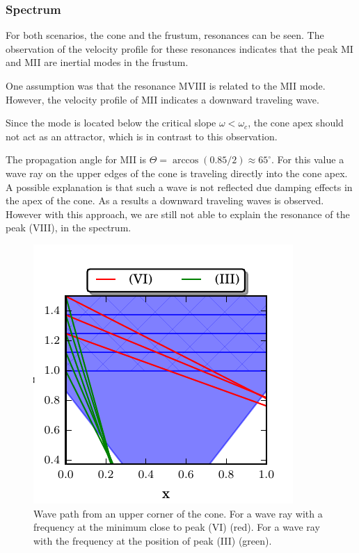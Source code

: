 \subsubsection{Spectrum}

For both scenarios, the cone and the frustum, resonances can be seen.
The observation of the velocity profile for these resonances indicates that
the peak M\RN{1} and M\RN{2} are inertial modes in the frustum.

One assumption was that the resonance M\RN{8} is related to the M\RN{2} mode.
However, the velocity profile of M\RN{2} indicates a downward traveling wave.

Since the mode is located below the critical slope $\omega < \omega_c$, the cone apex
should not act as an attractor, which is in contrast to this observation.

The propagation angle for M\RN{2} is $\Theta=\arccos(0.85/2)\approx65^\circ$.
For this value a wave ray on the upper edges of the cone is traveling directly
into the cone apex.
A possible explanation is that such a wave is not reflected due damping effects in
the apex of the cone. As a results a downward traveling waves is observed.
However with this approach, we are still not able to explain the resonance of the peak (\RN{8}),
in the spectrum.

\begin{figure}[!b]
  \begin{minipage}[c]{0.4\textwidth}
      \centering
      \includegraphics{gfx/cone/discussion/corners.pdf}
  \end{minipage}
  \hfill
  \begin{minipage}[c]{0.5\textwidth}
      \caption{\label{fig:conediscuss:corners}
        Wave path from an upper corner of the cone.
        For a wave ray with a frequency at the minimum close to peak (\RN{6}) (red).
        For a wave ray with the frequency at the position of peak (\RN{3}) (green).
      }
  \end{minipage}
\end{figure}

